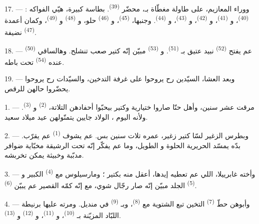 \VUsaut{2.4mm}
\VUsaut{3.0mm}

17. --- ووراء المعازيم، على طاولة مغطّاة بـ، محضّر
 \textsuperscript{(39)}. بطاسة كبيرة، هيّي الفواكه :
 \textsuperscript{(40)}، و
\textsuperscript{(41)}، و \textsuperscript{(42)}،
و \textsuperscript{(43)}، و
\textsuperscript{(44)}. وجنبها، 
\textsuperscript{(45)}، و \textsuperscript{(46)} حلو،
و \textsuperscript{(48)} و
\textsuperscript{(49)}، وكمان أعمدة  \textsuperscript{(47)}
نضيفة.

18. ---  \textsuperscript{(50)} عم يفتح 
\textsuperscript{(52)} نبيد عتيق بـ
\textsuperscript{(51)}. و \textsuperscript{(53)} مبيّن
إنّه كتير صعب تنشلح. وهالساقي عنده  \textsuperscript{(54)}
تحت باطه.

19. --- وبعد العشا، السيّدين رح يروحوا على غرفة التدخين، والسيّدات رح
يروحوا يحضّروا حالهن للرقص.

\VUsaut{5.0mm}
\VUsaut{1.6mm}
\VUsaut{2.6mm}

\VUsaut{3.0mm}

1. --- مرقت عشر سنين، وأهل حنّا صاروا ختيارية وكتير بيحبّوا أحفادهن
التلاتة،  \textsuperscript{(2)} و
\textsuperscript{(3)}. ولأنه اليوم ، الولاد
جايين يتمنّولهن عيد ميلاد سعيد.

2. --- وبطرس الزغير لسّا كتير زغير، عمره تلات سنين بس. عم يشوف
 \textsuperscript{(1)} عم يقرّب. بدّه يمسّد 
الحريرية الحلوة و الطويل، وما عم يفكّر إنّه تحت
 الرشيقة مخبّاية ضوافر مدبّبة وخبيثة يمكن تخربشه.

3. --- وأخته غابرييلا، اللي عم تعطيه إيدها، أعقل منه بكتير ؛ ومارسيلوس
مع  \textsuperscript{(4)} الكبير و
\textsuperscript{(5)} الجلد مبيّن إنّه صار رجّال شوي، مع إنّه كمّه
القصير عم يبيّن  \textsuperscript{(6)}.

4. --- وأبوهن حطّ  \textsuperscript{(7)} التخين تبع
الشتوية مع  \textsuperscript{(8)}، وبـ
\textsuperscript{(9)} في منديل. ومرته عليها برنيطة اللبّاد المزيّنة
بـ \textsuperscript{(10)}، و
\textsuperscript{(11)}، و \textsuperscript{(12)}
و \textsuperscript{(13)}.

